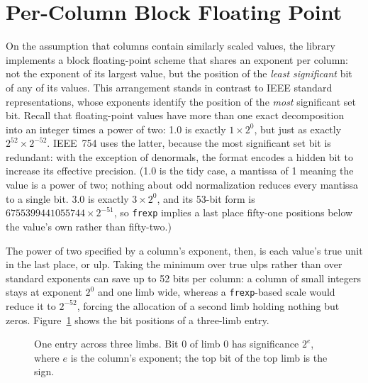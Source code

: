 \documentclass[acmsmall,screen,review]{acmart}
\newcommand{\code}[1]{\texttt{#1}}
\begin{document}
\section{Per-Column Block Floating Point}

On the assumption that columns contain similarly scaled values, the library implements a block floating-point scheme that shares an exponent per column: not the exponent of its largest value, but the position of the \emph{least significant} bit of any of its values. This arrangement stands in contrast to IEEE standard representations, whose exponents identify the position of the \emph{most} significant set bit. Recall that floating-point values have more than one exact decomposition into an integer times a power of two: 1.0 is exactly $1 \times 2^{0}$, but just as exactly $2^{52} \times 2^{-52}$. IEEE~754 uses the latter, because the most significant set bit is redundant: with the exception of denormals, the format encodes a hidden bit to increase its effective precision. (1.0 is the tidy case, a mantissa of 1 meaning the value is a power of two; nothing about odd normalization reduces every mantissa to a single bit. 3.0 is exactly $3 \times 2^0$, and its 53-bit form is $6755399441055744 \times 2^{-51}$, so \code{frexp} implies a last place fifty-one positions below the value's own rather than fifty-two.)

The power of two specified by a column's exponent, then, is each value's true unit in the last place, or ulp. Taking the minimum over true ulps rather than over standard exponents can save up to 52 bits per column: a column of small integers stays at exponent $2^0$ and one limb wide, whereas a \code{frexp}-based scale would reduce it to $2^{-52}$, forcing the allocation of a second limb holding nothing but zeros. Figure~\ref{fig:entry} shows the bit positions of a three-limb entry.

\begin{figure}[t]
\centering
{}
\caption{One entry across three limbs. Bit 0 of limb 0 has significance $2^{e}$, where $e$ is the column's exponent; the top bit of the top limb is the sign.}
\label{fig:entry}
\end{figure}
\end{document}
